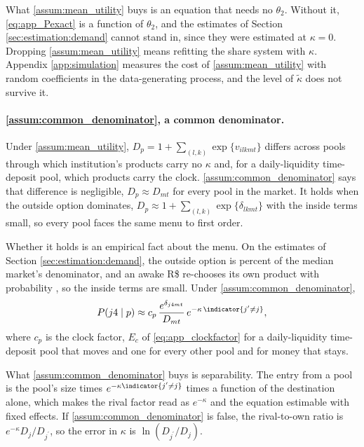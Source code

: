 What \ref{assum:mean_utility} buys is an equation that needs no $\theta_2$. Without it, \eqref{eq:app_Pexact} is a function of $\theta_2$, and the estimates of Section \ref{sec:estimation:demand} cannot stand in, since they were estimated at $\kappa=0$. Dropping \ref{assum:mean_utility} means refitting the share system with $\kappa$. Appendix \ref{app:simulation} measures the cost of \ref{assum:mean_utility} with random coefficients in the data-generating process, and the level of $\tilde{\kappa}$ does not survive it.

\paragraph{\ref{assum:common_denominator}, a common denominator.} Under \ref{assum:mean_utility}, $D_p=1+\sum_{(l,k)}\exp\{v_{ilkmt}\}$ differs across pools through which institution's products carry no $\kappa$ and, for a daily-liquidity time-deposit pool, which products carry the clock. \ref{assum:common_denominator} says that difference is negligible, $D_p\approx D_{mt}$ for every pool in the market. It holds when the outside option dominates, $D_p\approx 1+\sum_{(l,k)}\exp\{\delta_{lkmt}\}$ with the inside terms small, so every pool faces the same menu to first order.

Whether it holds is an empirical fact about the menu. On the estimates of Section \ref{sec:estimation:demand}, the outside option is  percent of the median market's denominator, and an awake R\$ re-chooses its own product with probability , so the inside terms are small. Under \ref{assum:common_denominator},
\begin{gather}
	P(j4\mid p)\approx c_{p}\,\frac{e^{\delta_{j4mt}}}{D_{mt}}\,e^{-\kappa\,\indicator{j^\prime\neq j}}, \label{eq:app_logit}
\end{gather}
where $c_p$ is the clock factor, $E_c$ of \eqref{eq:app_clockfactor} for a daily-liquidity time-deposit pool that moves and one for every other pool and for money that stays.

What \ref{assum:common_denominator} buys is separability. The entry from a pool is the pool's size times $e^{-\kappa\indicator{j^\prime\neq j}}$ times a function of the destination alone, which makes the rival factor read as $e^{-\kappa}$ and the equation estimable with fixed effects. If \ref{assum:common_denominator} is false, the rival-to-own ratio is $e^{-\kappa}D_{j}/D_{j^\prime}$, so the error in $\kappa$ is $\ln(D_{j^\prime}/D_{j})$.

